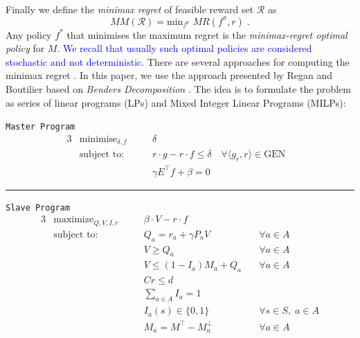 \documentclass[sigconf]{aamas}  %
\newcommand{\ET}[1]{{\textcolor{blue}{#1}}}
\begin{document}
Finally we define the \textit{minimax regret} of feasible reward set $\mathcal{R}$ as
$$MM(\mathcal{R}) = \text{min}_{f^{\pi}}\; MR(f^{\pi}, r)\;.$$
Any policy $f^*$  that minimises the maximum regret is the \textit{minimax-regret optimal policy} for $M$. 
\ET{We recall that usually such optimal policies are considered stochastic and not deterministic.}
There are several approaches for computing the minimax regret \cite{alizadeh2015,benavent2018,Regan2009,daSilva2011,Xu2009}. 
In this paper, we use the approach presented by Regan and Boutilier \citep{Regan2009} based on \textit{Benders Decomposition} \cite{Benders1962}.
 The idea is to formulate the problem as series of linear programs (LPs) and Mixed Integer Linear Programs (MILPs):


\begin{center}\label{minimax}
\texttt{Master Program}
\begin{alignat}{3}
&\text{minimise}_{\delta, f} && \delta & \\
&\text{subject to:}&\quad& r\cdot g - r \cdot f \leq \delta \quad \forall \langle g_r, r \rangle \in \text{GEN}\label{delta_cut}\\
&& \quad& \gamma E^{\top} f + \beta = 0 
\end{alignat}
\begin{center}
\noindent\rule{8cm}{0.4pt}
\end{center} 
\texttt{Slave Program}
\begin{alignat}{3}
&\text{maximize}_{Q, V, I, r} && \beta \cdot V - r \cdot f \\
&\text{subject to:} &\quad& Q_a = r_a + \gamma P_aV &\quad \forall a \in A\\
&& \quad& V \geq Q_a  &\quad \forall a \in A\\
&& \quad& V \leq (1-I_a)M_a + Q_a  &\quad \forall a \in A\\
&& \quad& Cr \leq d \\
&& \quad& \sum_{a \in A} I_a = 1  \label{eq:sum_I}\\
&& \quad& I_a(s) \in \{0, 1 \} &\quad \forall s \in S, \; a \in A \label{eq:bin_I}\\
&& \quad& M_a = M^{\top} - M_a^{\perp} &\quad \forall a \in A
\end{alignat}
\end{center}
\end{document}
